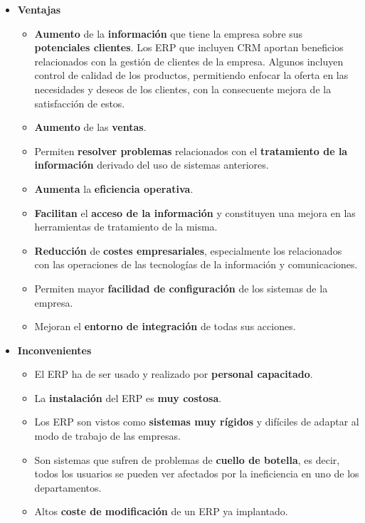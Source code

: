 \begin{itemize}
    \item \textbf{Ventajas}
    \begin{itemize}
        \item \textbf{Aumento} de la \textbf{información} que tiene la empresa sobre sus \textbf{potenciales clientes}. Los ERP que incluyen CRM aportan beneficios relacionados con la gestión de clientes de la empresa. Algunos incluyen control de calidad de los productos, permitiendo enfocar la oferta en las necesidades y deseos de los clientes, con la consecuente mejora de la satisfacción de estos.
        \item \textbf{Aumento} de las \textbf{ventas}.
        \item Permiten \textbf{resolver problemas} relacionados con el \textbf{tratamiento de la información} derivado del uso de sistemas anteriores.
        \item \textbf{Aumenta} la \textbf{eficiencia operativa}.
        \item \textbf{Facilitan} el \textbf{acceso de la información} y constituyen una mejora en las herramientas de tratamiento de la misma.
        \item \textbf{Reducción} de \textbf{costes empresariales}, especialmente los relacionados con las operaciones de las tecnologías de la información y comunicaciones.
        \item Permiten mayor \textbf{facilidad de configuración} de los sistemas de la empresa.
        \item Mejoran el \textbf{entorno de integración} de todas sus acciones.
    \end{itemize}
    \item \textbf{Inconvenientes}
    \begin{itemize}
        \item El ERP ha de ser usado y realizado por \textbf{personal capacitado}.
        \item La \textbf{instalación} del ERP es \textbf{muy costosa}.
        \item Los ERP son vistos como \textbf{sistemas muy rígidos} y difíciles de adaptar al modo de trabajo de las empresas.
        \item Son sistemas que sufren de problemas de \textbf{cuello de botella}, es decir, todos los usuarios se pueden ver afectados por la ineficiencia en uno de los departamentos.
        \item Altos \textbf{coste de modificación} de un ERP ya implantado.
    \end{itemize}
\end{itemize}

